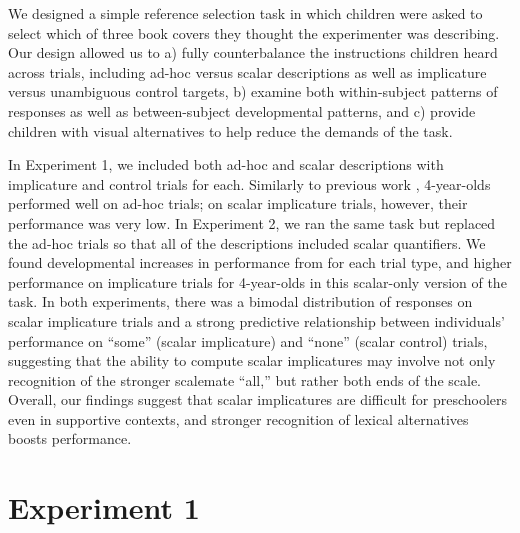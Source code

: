 \documentclass[10pt,letterpaper]{article}
\begin{document}
We designed a simple reference selection task in which children were asked to select which of three book covers they thought the experimenter was describing. Our design allowed us to a) fully counterbalance the instructions children heard across trials, including ad-hoc versus scalar descriptions as well as implicature versus unambiguous control targets, b) examine both within-subject patterns of responses as well as between-subject developmental patterns, and c) provide children with visual alternatives to help reduce the demands of the task.

In Experiment 1, we included both ad-hoc and scalar descriptions with implicature and control trials for each. Similarly to previous work \cite[e.g.,][]{stiller2014}, 4-year-olds performed well on ad-hoc trials; on scalar implicature trials, however, their performance was very low. In Experiment 2, we ran the same task but replaced the ad-hoc trials so that all of the descriptions included scalar quantifiers. We found developmental increases in performance from for each trial type, and higher performance on implicature trials for 4-year-olds in this scalar-only version of the task. In both experiments, there was a bimodal distribution of responses on scalar implicature trials and a strong predictive relationship between individuals' performance on ``some'' (scalar implicature) and ``none'' (scalar control) trials, suggesting that the ability to compute scalar implicatures may involve not only recognition of the stronger scalemate ``all,'' but rather both ends of the scale. Overall, our findings suggest that scalar implicatures are difficult for preschoolers even in supportive contexts, and stronger recognition of lexical alternatives boosts performance. 




\section{Experiment 1} 
\end{document}

